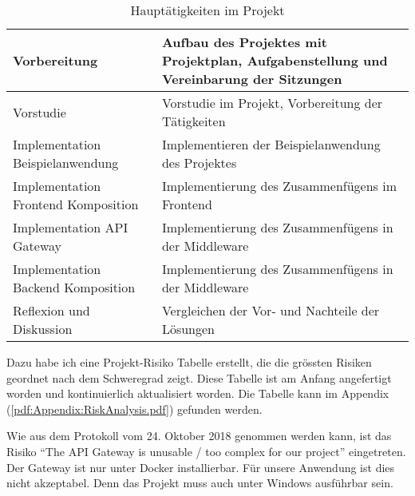 \begin{table}
    \centering
    \begin{tabularx}{\textwidth}{|Y|X|}
        \hline
        Vorbereitung & Aufbau des Projektes mit Projektplan, Aufgabenstellung und Vereinbarung der Sitzungen\\
        \hline
        Vorstudie & Vorstudie im Projekt, Vorbereitung der Tätigkeiten\\
        \hline
        Implementation Beispielanwendung & Implementieren der Beispielanwendung des Projektes \\
        \hline
        Implementation Frontend Komposition & Implementierung des Zusammenfügens im Frontend \\
        \hline
        Implementation API Gateway & Implementierung des Zusammenfügens in der Middleware \\
        \hline
        Implementation Backend Komposition & Implementierung des Zusammenfügens in der Middleware \\
        \hline
        Reflexion und Diskussion & Vergleichen der Vor- und Nachteile der Lösungen \\
        \hline
    \end{tabularx}
    \caption{Hauptätigkeiten im Projekt}
    \label{tab:Requirements:projectSchedule:Mainactivities}
\end{table}

Dazu habe ich eine Projekt-Risiko Tabelle erstellt, die die grössten Risiken geordnet nach dem Schweregrad zeigt. Diese Tabelle ist am Anfang angefertigt worden und kontinuierlich aktualisiert worden. Die Tabelle kann im Appendix (\ref{pdf:Appendix:RiskAnalysis.pdf}) gefunden werden.

Wie aus dem Protokoll vom 24. Oktober 2018 genommen werden kann, ist das Risiko \enquote{The API Gateway is unusable / too complex for our project} eingetreten. Der Gateway ist nur unter Docker installierbar. Für unsere Anwendung ist dies nicht akzeptabel. Denn das Projekt muss auch unter Windows ausführbar sein.